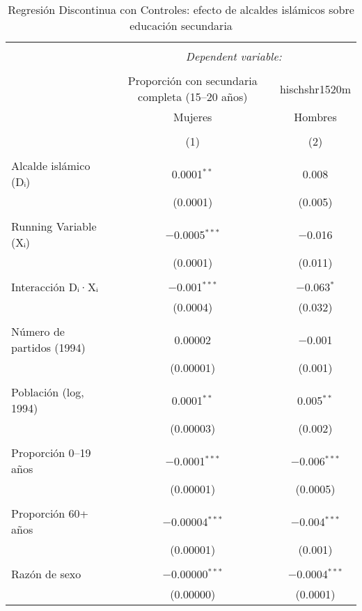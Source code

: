 
\begin{table}[ht!] \centering 
  \caption{Regresión Discontinua con Controles: efecto de alcaldes islámicos sobre educación secundaria} 
  \label{tab:rd_controles_mujeres_hombres} 
\begin{tabular}{@{\extracolsep{5pt}}lcc} 
\\[-1.8ex]\hline 
\hline \\[-1.8ex] 
 & \multicolumn{2}{c}{\textit{Dependent variable:}} \\ 
\cline{2-3} 
\\[-1.8ex] & Proporción con secundaria completa (15–20 años) & hischshr1520m \\ 
 & Mujeres & Hombres \\ 
\\[-1.8ex] & (1) & (2)\\ 
\hline \\[-1.8ex] 
 Alcalde islámico (Dᵢ) & 0.0001$^{**}$ & 0.008 \\ 
  & (0.0001) & (0.005) \\ 
  & & \\ 
 Running Variable (Xᵢ) & $-$0.0005$^{***}$ & $-$0.016 \\ 
  & (0.0001) & (0.011) \\ 
  & & \\ 
 Interacción Dᵢ·Xᵢ & $-$0.001$^{***}$ & $-$0.063$^{*}$ \\ 
  & (0.0004) & (0.032) \\ 
  & & \\ 
 Número de partidos (1994) & 0.00002 & $-$0.001 \\ 
  & (0.00001) & (0.001) \\ 
  & & \\ 
 Población (log, 1994) & 0.0001$^{**}$ & 0.005$^{**}$ \\ 
  & (0.00003) & (0.002) \\ 
  & & \\ 
 Proporción 0–19 años & $-$0.0001$^{***}$ & $-$0.006$^{***}$ \\ 
  & (0.00001) & (0.0005) \\ 
  & & \\ 
 Proporción 60+ años & $-$0.00004$^{***}$ & $-$0.004$^{***}$ \\ 
  & (0.00001) & (0.001) \\ 
  & & \\ 
 Razón de sexo & $-$0.00000$^{***}$ & $-$0.0004$^{***}$ \\ 
  & (0.00000) & (0.0001) \\ 

\end{tabular}
\end{table}
